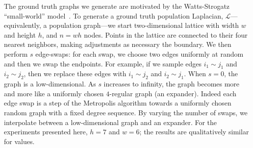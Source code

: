 \documentclass[12pt]{article}
\theoremstyle{plain}
\begin{document}
The ground truth graphs we generate are motivated by the
Watts-Strogatz ``small-world'' model~\cite{watts1998collective}.
To generate a ground truth population Laplacian, $\mathcal{L}$---equivalently, a
population graph---we start two-dimensional lattice with width $w$ and
height $h$, and $n = w h$ nodes.  Points in the lattice are connected
to their four nearest neighbors, making adjustments as necessary the
boundary.  We then perform $s$ edge-swaps: for each swap, we choose
two edges uniformly at random and then we swap the endpoints.  For
example, if we sample edges $i_1 \sim j_1$ and $i_2 \sim j_2$, then we
replace these edges with $i_1 \sim j_2$ and $i_2 \sim j_1$.  When
$s = 0$, the graph is a low-dimensional.  As $s$ increases to
infinity, the graph becomes more and more like a uniformly chosen
$4$-regular graph (an expander).  Indeed each edge swap is a step of
the Metropolis algorithm towards a uniformly chosen random graph with
a fixed degree sequence.  By varying the number of swaps,
we interpolate between a low-dimensional graph and an expander.  For
the experiments presented here, $h = 7$ and $w = 6$; the
results are qualitatively similar for values.
\end{document}
